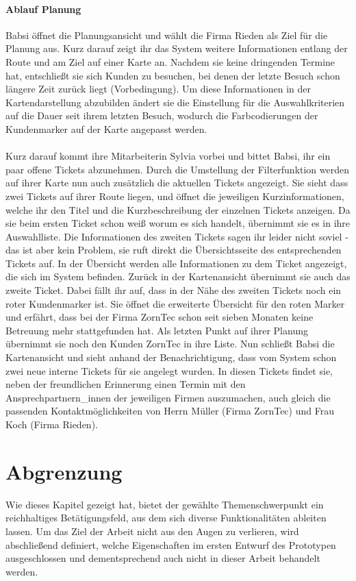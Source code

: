 \documentclass[Bachelorarbeit.tex]{subfiles}
\begin{document}
\paragraph*{Ablauf Planung}
Babsi öffnet die Planungsansicht und wählt die Firma Rieden als Ziel für die Planung aus.
Kurz darauf zeigt ihr das System weitere Informationen entlang der Route und am Ziel auf einer Karte an.
Nachdem sie keine dringenden Termine hat, entschließt sie sich Kunden zu besuchen, bei denen der letzte Besuch schon längere Zeit zurück liegt (Vorbedingung).
Um diese Informationen in der Kartendarstellung abzubilden ändert sie die Einstellung für die Auswahlkriterien auf die Dauer seit ihrem letzten Besuch, wodurch die Farbcodierungen der Kundenmarker auf der Karte angepasst werden.\\
\\
Kurz darauf kommt ihre Mitarbeiterin Sylvia vorbei und bittet Babsi, ihr ein paar offene Tickets abzunehmen. 
Durch die Umstellung der Filterfunktion werden auf ihrer Karte nun auch zusätzlich die aktuellen Tickets angezeigt.
Sie sieht dass zwei Tickets auf ihrer Route liegen, und öffnet die jeweiligen Kurzinformationen, welche ihr den Titel und die Kurzbeschreibung der einzelnen Tickets anzeigen. 
Da sie beim ersten Ticket schon weiß worum es sich handelt, übernimmt sie es in ihre Auswahlliste.
Die Informationen des zweiten Tickets sagen ihr leider nicht soviel - das ist aber kein Problem, sie ruft direkt die Übersichtsseite des entsprechenden Tickets auf.
In der Übersicht werden alle Informationen zu dem Ticket angezeigt, die sich im System befinden.
Zurück in der Kartenansicht übernimmt sie auch das zweite Ticket. 
Dabei fällt ihr auf, dass in der Nähe des zweiten Tickets noch ein roter Kundenmarker ist.
Sie öffnet die erweiterte Übersicht für den roten Marker und erfährt, dass bei der Firma ZornTec schon seit sieben Monaten keine Betreuung mehr stattgefunden hat.
Als letzten Punkt auf ihrer Planung übernimmt sie noch den Kunden ZornTec in ihre Liste. 
Nun schließt Babsi die Kartenansicht und sieht anhand der Benachrichtigung, dass vom System schon zwei neue interne Tickets für sie angelegt wurden.
In diesen Tickets findet sie, neben der freundlichen Erinnerung einen Termin mit den Ansprechpartnern\_innen der jeweiligen Firmen auszumachen, auch gleich die passenden Kontaktmöglichkeiten von Herrn Müller (Firma ZornTec) und Frau Koch (Firma Rieden).


\section{Abgrenzung}
Wie dieses Kapitel gezeigt hat, bietet der gewählte Themenschwerpunkt ein reichhaltiges Betätigungsfeld, aus dem sich diverse Funktionalitäten ableiten lassen. 
Um das Ziel der Arbeit nicht aus den Augen zu verlieren, wird abschließend definiert, welche Eigenschaften im ersten Entwurf des Prototypen ausgeschlossen und dementsprechend auch nicht in dieser Arbeit behandelt werden. 
\end{document}
